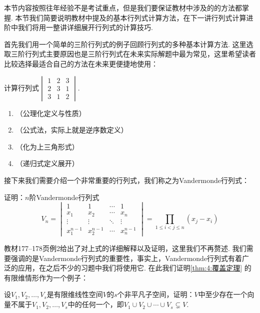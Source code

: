 本节内容按照往年经验不是考试重点，但是我们要保证教材中涉及的的方法都掌握. 本节我们简要说明教材中提及的基本行列式计算方法，在下一讲行列式计算进阶中我们将用一整讲详细展开行列式的计算技巧.

首先我们用一个简单的三阶行列式的例子回顾行列式的多种基本计算方法. 这里选取三阶行列式主要原因也是三阶行列式在未来实际解题中最为常见，这里希望读者比较选择最适合自己的方法在未来更便捷地使用：
\begin{example}
    计算行列式$\begin{vmatrix}
            1 & 2 & 3 \\
            2 & 3 & 1 \\
            3 & 1 & 2
        \end{vmatrix}$.
\end{example}

\begin{solution}
    \begin{enumerate}
        \item （公理化定义与性质）

        \item （公式法，实际上就是逆序数定义）

        \item （化为上三角形式）

        \item （递归式定义展开）
    \end{enumerate}
\end{solution}

接下来我们需要介绍一个非常重要的行列式，我们称之为Vandermonde行列式：
\begin{example}
    证明：$n$阶Vandermonde行列式
    \[V_n=\begin{vmatrix}
            1         & 1         & \cdots & 1         \\
            x_1       & x_2       & \cdots & x_n       \\
            \vdots    & \vdots    & \ddots & \vdots    \\
            x_1^{n-1} & x_2^{n-1} & \cdots & x_n^{n-1}
        \end{vmatrix}=\prod_{1 \leqslant i < j \leqslant n}(x_j-x_i)\]
\end{example}

教材177--178页例2给出了对上式的详细解释以及证明，这里我们不再赘述. 我们需要强调的是Vandermonde行列式的重要性，事实上，Vandermonde行列式有着广泛的应用，在之后不少的习题中我们将使用它. 在此我们证明\autoref{thm:4:覆盖定理} 的有限维情形作为一个例子：
\begin{example}\label{ex:13:行列式证明覆盖定理}
    设$V_1,V_2,\ldots,V_s$是有限维线性空间$V$的$s$个非平凡子空间，证明：$V$中至少存在一个向量不属于$V_1,V_2,\ldots,V_s$中的任何一个，即$V_1 \cup V_2 \cup \cdots \cup V_s\subsetneq V.$
\end{example}

